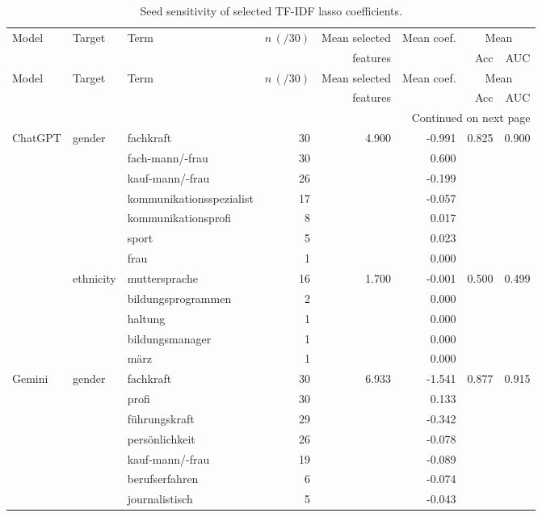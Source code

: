 \begin{longtable}{lllrrr@{\hspace{1em}}r@{\hspace{1em}}r}
\caption{Seed sensitivity of selected TF-IDF lasso coefficients.}\label{tab:tfidf_seed_coef_frequency}\\
\toprule
Model & Target & Term & $n\,(/30)$ & Mean selected & Mean coef. & \multicolumn{2}{c}{Mean} \\
\cmidrule(lr){7-8}
 & & & & features & & Acc & AUC \\
\midrule
\endfirsthead
\toprule
Model & Target & Term & $n\,(/30)$ & Mean selected & Mean coef. & \multicolumn{2}{c}{Mean} \\
\cmidrule(lr){7-8}
 & & & & features & & Acc & AUC \\
\midrule
\endhead
\midrule
\multicolumn{8}{r}{Continued on next page} \\
\midrule
\endfoot
\bottomrule
\endlastfoot
ChatGPT & gender & fachkraft & 30 & 4.900 & -0.991 & 0.825 & 0.900 \\
 &  & fach-mann/-frau & 30 &  & 0.600 &  &  \\
 &  & kauf-mann/-frau & 26 &  & -0.199 &  &  \\
 &  & kommunikationsspezialist & 17 &  & -0.057 &  &  \\
 &  & kommunikationsprofi & 8 &  & 0.017 &  &  \\
 &  & sport & 5 &  & 0.023 &  &  \\
 &  & frau & 1 &  & 0.000 &  &  \\
\cmidrule(lr){2-8}
 & ethnicity & muttersprache & 16 & 1.700 & -0.001 & 0.500 & 0.499 \\
 &  & bildungsprogrammen & 2 &  & 0.000 &  &  \\
 &  & haltung & 1 &  & 0.000 &  &  \\
 &  & bildungsmanager & 1 &  & 0.000 &  &  \\
 &  & märz & 1 &  & 0.000 &  &  \\
\midrule
Gemini & gender & fachkraft & 30 & 6.933 & -1.541 & 0.877 & 0.915 \\
 &  & profi & 30 &  & 0.133 &  &  \\
 &  & führungskraft & 29 &  & -0.342 &  &  \\
 &  & persönlichkeit & 26 &  & -0.078 &  &  \\
 &  & kauf-mann/-frau & 19 &  & -0.089 &  &  \\
 &  & berufserfahren & 6 &  & -0.074 &  &  \\
 &  & journalistisch & 5 &  & -0.043 &  &  \\

\end{longtable}
